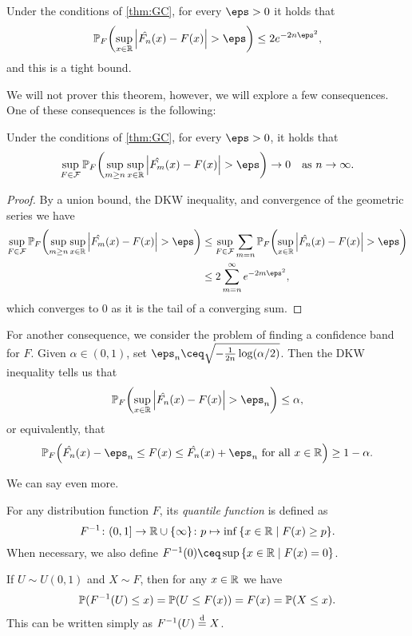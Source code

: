 \begin{theorem} 
    Under the conditions of \cref{thm:GC}, for every $\eps > 0$ it holds that
    \[
    \PP_F \qty(\sup_{x \in \RR} \abs{\hat{F_n}(x) - F(x)} > \eps) \leq 2e^{-2n\eps^2},
    \]
    and this is a tight bound. 
\end{theorem}

We will not prover this theorem, however, we will explore a few consequences. 
One of these consequences is the following: 

\begin{corollary} Under the conditions of \cref{thm:GC}, for every $\eps > 0$, it holds that
    \[
    \sup_{F \in \Cal F} \PP_F \qty(\sup_{m \geq n} \sup_{x \in \RR} \abs{\hat{F_m}(x) - F(x)} > \eps) \to 0 \quad\text{as $n \to\infty$.}
    \]
\end{corollary}

\begin{proof}
    By a union bound, the DKW inequality, and convergence of the geometric series we have
    \begin{align*}
    \sup_{F \in \Cal F} \PP_F \qty(\sup_{m \geq n} \sup_{x \in \RR} \abs{\hat{F_m}(x) - F(x)} > \eps) &\leq \sup_{F \in \Cal F} \sum_{m = n} \PP_F \qty(\sup_{x \in \RR} \abs{\hat{F_n}(x) - F(x)} > \eps) \\
    &\leq 2 \sum_{m=n}^\infty e^{-2m\eps^2},    \end{align*}
which converges to 0 as it is the tail of a converging sum. 
\end{proof}

For another consequence, we consider the problem of finding a confidence band for $F$. Given $\alpha \in (0, 1)$, set $\eps_n \ceq \sqrt{-\frac1{2n}\log(\alpha/2)}$. Then the DKW inequality tells us that
\[
\PP_F \qty( \sup_{x \in \RR} \abs{\hat{F_n}(x) - F(x)} > \eps_n) \leq \alpha,
\]
or equivalently, that 
\[
\PP_F\qty(\hat{F_n}(x) - \eps_n \leq F(x) \leq \hat{F_n}(x) + \eps_n \ \text{for all $x \in \RR$}) \geq 1 - \alpha. 
\]

We can say even more.

\begin{recap}
    For any distribution function $F$, its \emph{quantile function} is defined as
    \[
    F^{-1} \colon (0, 1] \to \mathbb R \cup \qty{\infty} \colon p \mapsto \inf \qty{x \in \mathbb R\mid F(x) \geq p}. 
    \]
    When necessary, we also define $F^{-1}(0) \ceq \sup\qty{x \in \RR \mid F(x) = 0}$.
    
    If $U \sim U(0, 1)$ and $X \sim F$, then for any $x \in \mathbb R$ we have
    \[
    \mathbb P(F^{-1}(U) \leq x) = \mathbb P(U \leq F(x)) = F(x) = \mathbb P(X \leq x). 
    \]
    This can be written simply as $F^{-1}(U) \overset{\mathrm{d}}= X$. 
\end{recap}

